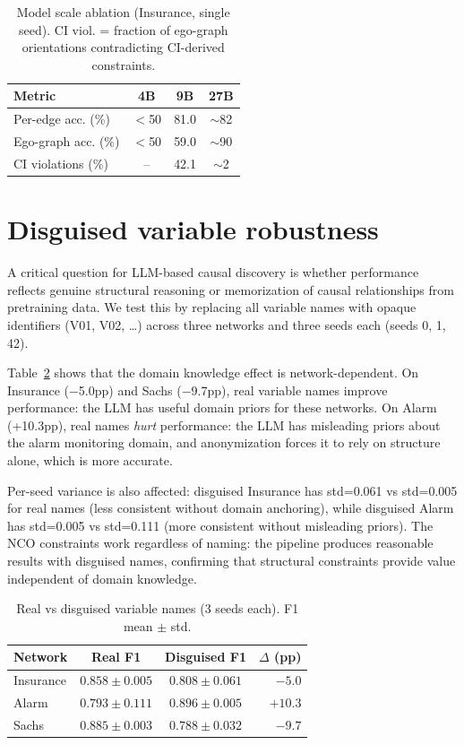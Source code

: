 \documentclass{article}
\begin{document}
\begin{table}[h]
\centering
\caption{Model scale ablation (Insurance, single seed). CI viol. = fraction of ego-graph orientations contradicting CI-derived constraints.}
\small
\begin{tabular}{lccc}
\toprule
Metric & 4B & 9B & 27B \\
\midrule
Per-edge acc. (\%) & $<$50 & 81.0 & $\sim$82 \\
Ego-graph acc. (\%) & $<$50 & 59.0 & $\sim$90 \\
CI violations (\%) & -- & 42.1 & $\sim$2 \\
\bottomrule
\end{tabular}
\label{tab:scale}
\end{table}


\section{Disguised variable robustness}
\label{app:disguised}

A critical question for LLM-based causal discovery is whether performance reflects genuine structural reasoning or memorization of causal relationships from pretraining data. We test this by replacing all variable names with opaque identifiers (V01, V02, \ldots) across three networks and three seeds each (seeds 0, 1, 42).

Table~\ref{tab:disguised} shows that the domain knowledge effect is network-dependent. On Insurance ($-$5.0pp) and Sachs ($-$9.7pp), real variable names improve performance: the LLM has useful domain priors for these networks. On Alarm (+10.3pp), real names \textit{hurt} performance: the LLM has misleading priors about the alarm monitoring domain, and anonymization forces it to rely on structure alone, which is more accurate.

Per-seed variance is also affected: disguised Insurance has std=0.061 vs std=0.005 for real names (less consistent without domain anchoring), while disguised Alarm has std=0.005 vs std=0.111 (more consistent without misleading priors). The NCO constraints work regardless of naming: the pipeline produces reasonable results with disguised names, confirming that structural constraints provide value independent of domain knowledge.

\begin{table}[h]
\centering
\caption{Real vs disguised variable names (3 seeds each). F1 mean $\pm$ std.}
\small
\begin{tabular}{lccr}
\toprule
Network & Real F1 & Disguised F1 & $\Delta$ (pp) \\
\midrule
Insurance & $0.858 \pm 0.005$ & $0.808 \pm 0.061$ & $-5.0$ \\
Alarm     & $0.793 \pm 0.111$ & $0.896 \pm 0.005$ & $+10.3$ \\
Sachs     & $0.885 \pm 0.003$ & $0.788 \pm 0.032$ & $-9.7$ \\
\bottomrule
\end{tabular}
\label{tab:disguised}
\end{table}
\end{document}
